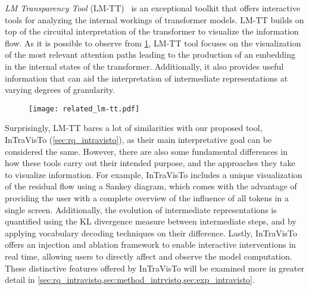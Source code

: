 \emph{LM Transparency Tool} (LM-TT)~\cite{tufanov2024} is an exceptional toolkit that offers interactive tools for analyzing the internal workings of transformer models.
LM-TT builds on top of the circuital interpretation of the transformer to visualize the information flow.
As it is possible to observe from \cref{fig:related_lm-tt}, LM-TT tool focuses on the visualization of the most relevant attention paths leading to the production of an embedding in the internal states of the transformer.
Additionally, it also provides useful information that can aid the interpretation of intermediate representations at varying degrees of granularity.

\begin{figure}[t!]
    \centering
    \texttt{[image: related\_lm-tt.pdf]}
    \caption{}
    \label{fig:related_lm-tt}
\end{figure}

Surprisingly, LM-TT bares a lot of similarities with our proposed tool, InTraVisTo (\cref{sec:rq_intravisto}), as their main interpretative goal can be considered the same.
However, there are also some fundamental differences in how these tools carry out their intended purpose, and the approaches they take to visualize information.
For example, InTraVisTo includes a unique visualization of the residual flow using a Sankey diagram, which comes with the advantage of providing the user with a complete overview of the influence of all tokens in a single screen.
Additionally, the evolution of intermediate representations is quantified using the KL divergence measure between intermediate steps, and by applying vocabulary decoding techniques on their difference.
Lastly, InTraVisTo offers an injection and ablation framework to enable interactive interventions in real time, allowing users to directly affect and observe the model computation.
These distinctive features offered by InTraVisTo will be examined more in greater detail in \cref{sec:rq_intravisto,sec:method_intrvisto,sec:exp_intravisto}.
